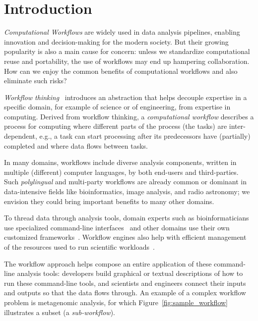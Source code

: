 \documentclass[sigconf,revew,screen,timestamp,nonacm]{acmart}
\begin{document}
\maketitle

\section{Introduction} \label{sec:intro}\label{sec:introduction}
\textit{Computational Workflows} are widely used in data analysis pipelines, enabling innovation and decision-making for the modern society. But their growing popularity is also a main cause for concern: unless we standardize computational reuse and portability, the use of workflows may end up hampering collaboration. How can we enjoy the common benefits of computational workflows and also eliminate such risks?

\textit{Workflow thinking}~\cite{gryk_workflows_2017} introduces an abstraction that helps decouple expertise in a specific domain, for example of science or of engineering, from expertise in computing. Derived from workflow thinking, a \textit{computational workflow} describes a process for computing where different parts of the process (the tasks) are inter-dependent, e.g., a task can start processing after its predecessors have (partially) completed and where data flows between tasks.

In many domains, workflows include diverse analysis components, written in multiple (different) computer languages, by both end-users and third-parties. Such \emph{polylingual} and multi-party workflows are already common or dominant in data-intensive fields like bioinformatics, image analysis, and radio astronomy; we envision they could bring important benefits to many other domains.

To thread data through analysis tools, domain experts such as bioinformaticians use specialized command-line interfaces~\cite{seemann_ten_2013,georgeson_bionitio_2019} and other domains use their own customized frameworks~\cite{babuji_parsl_2019,berthold_knime_2009}. Workflow engines also help with efficient management of the resources used to run scientific workloads~\cite{deelman_pegasus_2015,couvares_workflow_2007}.

The workflow approach helps compose an entire application of these command-line analysis tools: developers build graphical or textual descriptions of how to run these command-line tools, and scientists and engineers connect their inputs and outputs so that the data flows through. An example of a complex workflow problem is metagenomic analysis, for which Figure~\ref{fig:sample_workflow} illustrates a subset (a \textit{sub-workflow}).
\end{document}
